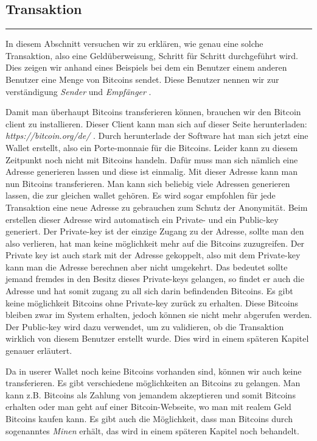 \vspace*{1mm}
\subsection*{Transaktion}
\vspace{-10mm}
\noindent\rule{0.8\textwidth}{0.4pt}

\vspace{5mm}

\noindent
In diesem Abschnitt versuchen wir zu erklären, wie genau eine solche Transaktion, also eine Geldüberweisung, Schritt für Schritt durchgeführt wird.
Dies zeigen wir anhand eines Beispiels bei dem ein Benutzer einem anderen Benutzer eine Menge von Bitcoins sendet. Diese Benutzer nennen wir zur verständigung
\emph{\dq Sender \dq} und \emph{\dq Empfänger \dq}.

\noindent
Damit man überhaupt Bitcoins transferieren können, brauchen wir den Bitcoin client zu installieren. Dieser Client kann man sich auf dieser Seite herunterladen: \emph{\dq https://bitcoin.org/de/ \dq}.
Durch herunterlade der Software hat man sich jetzt eine Wallet erstellt, also ein Porte-monnaie für die Bitcoins. Leider kann zu diesem Zeitpunkt noch nicht mit Bitcoins handeln.
Dafür muss man sich nämlich eine Adresse generieren lassen und diese ist einmalig. Mit dieser Adresse kann man nun Bitcoins transferieren.
Man kann sich beliebig viele Adressen generieren lassen, die zur gleichen wallet gehören. Es wird sogar empfohlen für jede Transaktion eine neue Adresse zu gebrauchen zum Schutz der Anonymität.
Beim erstellen dieser Adresse wird automatisch ein Private- und ein Public-key generiert. Der Private-key ist der einzige Zugang zu der Adresse, sollte man den also verlieren, hat man keine möglichkeit mehr
auf die Bitcoins zuzugreifen. Der Private key ist auch stark mit der Adresse gekoppelt, also mit dem Private-key kann man die Adresse berechnen aber nicht umgekehrt. Das bedeutet sollte jemand fremdes in den
Besitz dieses Private-keys gelangen, so findet er auch die Adresse und hat somit zugang zu all sich darin befindenden Bitcoins. Es gibt keine möglichkeit Bitcoins ohne Private-key zurück zu erhalten.
Diese Bitcoins bleiben zwar im System erhalten, jedoch können sie nicht mehr abgerufen werden. Der Public-key wird dazu verwendet, um zu validieren, ob die Transaktion wirklich von diesem Benutzer
erstellt wurde. Dies wird in einem späteren Kapitel genauer erläutert.

\noindent
Da in userer Wallet noch keine Bitcoins vorhanden sind, können wir auch keine transferieren. Es gibt verschiedene möglichkeiten an Bitcoins zu gelangen.
Man kann z.B. Bitcoins als Zahlung von jemandem akzeptieren und somit Bitcoins erhalten oder man geht auf einer Bitcoin-Webseite, wo man mit realem Geld Bitcoins kaufen kann.
Es gibt auch die Möglichkeit, dass man Bitcoins durch sogenanntes \emph{\dq Minen \dq} erhält, das wird in einem späteren Kapitel noch behandelt.

